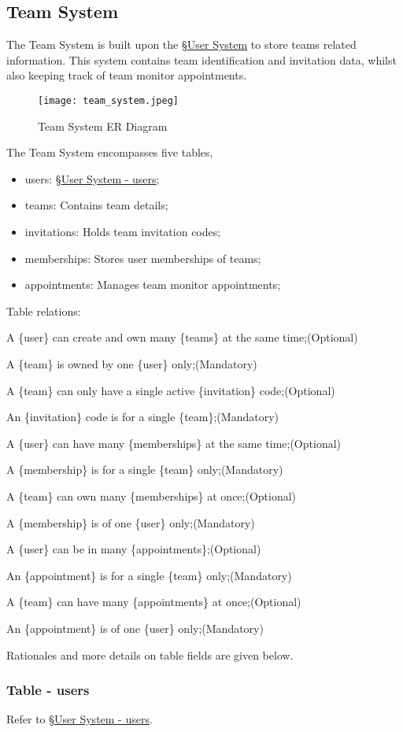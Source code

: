 \documentclass[12pt]{report}
\newcommand{\n}{\par}
\newcommand{\br}{\n\vspace{1 em}\n}
\begin{document}
\subsection{Team System} \label{data-layer.design.team-system}
The Team System is built upon the \S \hyperref[data-layer.design.user-system]{User System} to store teams related information.
This system contains team identification and invitation data,
whilst also keeping track of team monitor appointments.
\br
\begin{figure}[h!]
	\centering
	\texttt{[image: team\_system.jpeg]}
	\caption{Team System ER Diagram}
	\label{fig:team-system-er}
\end{figure}
\br
The Team System encompasses five tables,
\begin{itemize}
	\item users: \S \hyperref[data-layer.design.user-system.users]{User System - users};
	\item teams: Contains team details;
	\item invitations: Holds team invitation codes;
	\item memberships: Stores user memberships of teams;
	\item appointments: Manages team monitor appointments;
\end{itemize}
\br
Table relations:\n
A \{user\} can create and own many \{teams\} at the same time;\null\hfill (Optional)\n
A \{team\} is owned by one \{user\} only;\null\hfill (Mandatory)
\br
A \{team\} can only have a single active \{invitation\} code;\null\hfill (Optional)\n
An \{invitation\} code is for a single \{team\};\null\hfill (Mandatory)
\br
A \{user\} can have many \{memberships\} at the same time;\null\hfill (Optional)\n
A \{membership\} is for a single \{team\} only;\null\hfill (Mandatory)
\br
A \{team\} can own many \{memberships\} at once;\null\hfill (Optional)\n
A \{membership\} is of one \{user\} only;\null\hfill (Mandatory)
\br
A \{user\} can be in many \{appointments\};\null\hfill (Optional)\n
An \{appointment\} is for a single \{team\} only;\null\hfill (Mandatory)
\br
A \{team\} can have many \{appointments\} at once;\null\hfill (Optional)\n
An \{appointment\} is of one \{user\} only;\null\hfill (Mandatory)
\br
Rationales and more details on table fields are given below.

\subsubsection{Table - users} \label{data-layer.design.team-system.users}
Refer to \S \hyperref[data-layer.design.user-system.users]{User System - users}.
\end{document}
